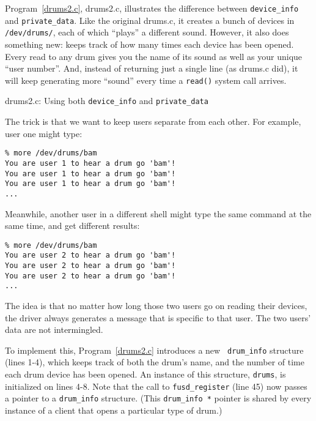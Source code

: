 \documentclass{article}
\begin{document}
Program~\ref{drums2.c}, drums2.c, illustrates the difference between
{\tt device\_info} and {\tt private\_data}.  Like the original
drums.c, it creates a bunch of devices in {\tt /dev/drums/}, each of
which ``plays'' a different sound.  However, it also does something
new: keeps track of how many times each device has been opened.  Every
read to any drum gives you the name of its sound as well as your
unique ``user number''.  And, instead of returning just a single line
(as drums.c did), it will keep generating more ``sound'' every time a
{\tt read()} system call arrives.

\begin{Program}
\caption{drums2.c: Using both {\tt device\_info} and {\tt private\_data}}
\label{drums2.c}
\end{Program}

The trick is that we want to keep users separate from each other.  For
example, user one might type:\\
\begin{minipage}{\textwidth}
\vspace{\baselineskip}
\begin{verbatim}
% more /dev/drums/bam
You are user 1 to hear a drum go 'bam'!
You are user 1 to hear a drum go 'bam'!
You are user 1 to hear a drum go 'bam'!
...

\end{verbatim}
\end{minipage}

Meanwhile, another user in a different shell might type the same
command at the same time, and get different results:\\
\begin{minipage}{\textwidth}
\vspace{\baselineskip}
\begin{verbatim}
% more /dev/drums/bam
You are user 2 to hear a drum go 'bam'!
You are user 2 to hear a drum go 'bam'!
You are user 2 to hear a drum go 'bam'!
...

\end{verbatim}
\end{minipage}

The idea is that no matter how long those two users go on reading
their devices, the driver always generates a message that is specific
to that user.  The two users' data are not intermingled.

To implement this, Program~\ref{drums2.c} introduces a new {\tt
drum\_info} structure (lines 1-4), which keeps track of both the
drum's name, and the number of time each drum device has been opened.
An instance of this structure, {\tt drums}, is initialized on lines
4-8.  Note that the call to {\tt fusd\_register} (line 45) now passes
a pointer to a {\tt drum\_info} structure.  (This {\tt drum\_info *}
pointer is shared by every instance of a client that opens a
particular type of drum.)
\end{document}
